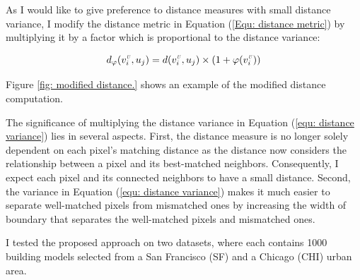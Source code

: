 \documentclass{iitthesis}
\begin{document}
As I would like to give preference to distance measures with small distance variance, I modify the distance metric in Equation (\ref{Equ: distance metric}) by multiplying it by a factor which is proportional to the distance variance:

\begin{equation}
d_{\varphi}(v_i^{\scalebox{.5}{\textit{U}}}, u_j)=d(v_i^{\scalebox{.5}{\textit{U}}}, u_j)\times(1+\varphi(v_i^{\scalebox{.5}{\textit{U}}}))
\label{equ: distance variance}
\end{equation}  

Figure \ref{fig: modified distance.} shows an example of the modified distance computation.

The significance of multiplying the distance variance in Equation (\ref{equ: distance variance}) lies in several aspects. First, the distance measure is no longer solely dependent on each pixel's matching distance as the distance now considers the relationship between a pixel and its best-matched neighbors. Consequently, I expect each pixel and its connected neighbors to have a small distance. Second, the variance in Equation (\ref{equ: distance variance}) makes it much easier to separate well-matched pixels from mismatched ones by increasing the width of boundary that separates the well-matched pixels and mismatched ones.

I tested the proposed approach on two datasets, where each contains 1000 building models selected from a San Francisco (SF) and a Chicago (CHI) urban area.
\end{document}
